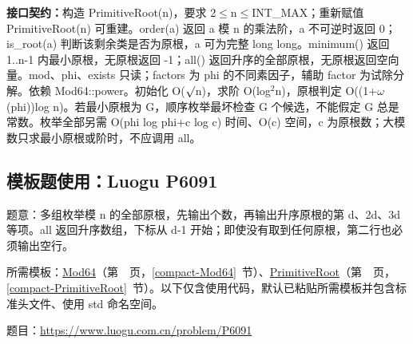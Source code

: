 {\sloppy{}\noindent\textbf{接口契约：}构造 PrimitiveRoot(n)，要求 2$\le$n$\le$INT\_MAX；重新赋值 PrimitiveRoot(n) 可重建。order(a) 返回 a 模 n 的乘法阶，a 不可逆时返回 0；is\_root(a) 判断该剩余类是否为原根，a 可为完整 long long。minimum() 返回 1..n-1 内最小原根，无原根返回 -1；all() 返回升序的全部原根，无原根返回空向量。mod、phi、exists 只读；factors 为 phi 的不同素因子，辅助 factor 为试除分解。依赖 Mod64::power。初始化 O($\sqrt{\vphantom x}$n)，求阶 O(log$^{2}$n)，原根判定 O((1+$\omega$(phi))log n)。若最小原根为 G，顺序枚举最坏检查 G 个候选，不能假定 G 总是常数。枚举全部另需 O(phi log phi+c log c) 时间、O(c) 空间，c 为原根数；大模数只求最小原根或阶时，不应调用 all。\par}



\Needspace{286pt}



\Needspace{231pt}



\Needspace{187pt}



\Needspace{421pt}

\subsection*{模板题使用：Luogu P6091}

\label{usage-example-48}

题意：多组枚举模 n 的全部原根，先输出个数，再输出升序原根的第 d、2d、3d 等项。all 返回升序数组，下标从 d-1 开始；即使没有取到任何原根，第二行也必须输出空行。

所需模板：\hyperref[compact-Mod64]{Mod64}（第~\pageref{compact-Mod64}~页，\ref{compact-Mod64}~节）、\hyperref[compact-PrimitiveRoot]{PrimitiveRoot}（第~\pageref{compact-PrimitiveRoot}~页，\ref{compact-PrimitiveRoot}~节）。以下仅含使用代码，默认已粘贴所需模板并包含标准头文件、使用 std 命名空间。

题目：\url{https://www.luogu.com.cn/problem/P6091}



